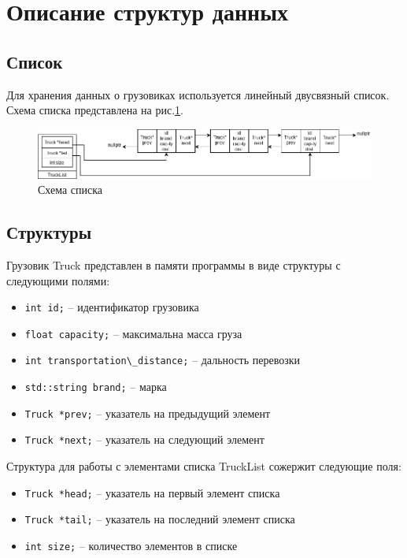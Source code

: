 \section*{Описание структур данных}

\subsection*{Список}

Для хранения данных о грузовиках используется линейный двусвязный список.
Схема списка представлена на рис.\ref{list_schema}.

\begin{figure}[htp!]
    \centering
    \includegraphics[width=0.9\linewidth]{photo/list_schema}
    \caption{Схема списка}
    \label{list_schema}
\end{figure}

\subsection*{Структуры}

Грузовик Truck представлен в памяти программы в виде структуры с следующими полями:

\begin{itemize}
    \item \verb|int id;| -- идентификатор грузовика
    \item \verb|float capacity;| -- максимальна масса груза
    \item \verb|int transportation\_distance;| -- дальность перевозки
    \item \verb|std::string brand;| -- марка
    \item \verb|Truck *prev;| -- указатель на предыдущий элемент
    \item \verb|Truck *next;| -- указатель  на следующий элемент
\end{itemize}

Структура для работы с элементами списка TruckList сожержит следующие поля:

\begin{itemize}
    \item \verb|Truck *head;| -- указатель на первый элемент списка
    \item \verb|Truck *tail;| -- указатель на последний элемент списка
    \item \verb|int size;| -- количество элементов в списке
\end{itemize}


